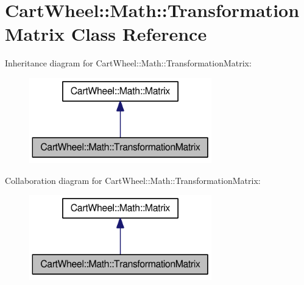 \hypertarget{classCartWheel_1_1Math_1_1TransformationMatrix}{
\section{CartWheel::Math::TransformationMatrix Class Reference}
\label{classCartWheel_1_1Math_1_1TransformationMatrix}
}


Inheritance diagram for CartWheel::Math::TransformationMatrix:\nopagebreak
\begin{figure}[H]
\begin{center}
\leavevmode
\includegraphics[width=224pt]{classCartWheel_1_1Math_1_1TransformationMatrix__inherit__graph}
\end{center}
\end{figure}


Collaboration diagram for CartWheel::Math::TransformationMatrix:\nopagebreak
\begin{figure}[H]
\begin{center}
\leavevmode
\includegraphics[width=224pt]{classCartWheel_1_1Math_1_1TransformationMatrix__coll__graph}
\end{center}
\end{figure}
